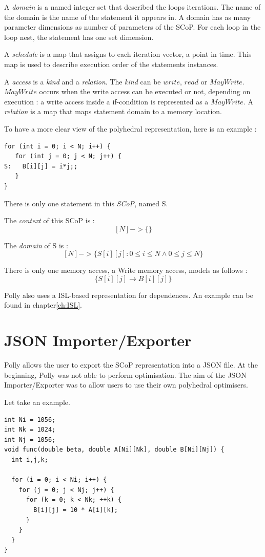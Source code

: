 A \emph{domain} is a named integer set that described the loops iterations. The name of the domain is the name of the statement it appears in. A domain has as many parameter dimensions as number of parameters of the SCoP. For each loop in the loop nest, the statement has one set dimension.

A \emph{schedule} is a map that assigns to each iteration vector, a point in time. This map is used to describe execution order of the statements instances.

A \emph{access} is a \emph{kind} and a \emph{relation}. The \emph{kind} can be $write$, $read$ or $MayWrite$. $MayWrite$ occurs when the write access can be executed or not, depending on execution : a write access inside a if-condition is represented as a $MayWrite$. A \emph{relation} is a map that maps statement domain to a memory location. 

To have a more clear view of the polyhedral representation, here is an example :
\begin{lstlisting}[frame=single]
for (int i = 0; i < N; i++) {
   for (int j = 0; j < N; j++) {
S:   B[i][j] = i*j;;
   }
}
\end{lstlisting}
There is only one statement in this \emph{SCoP}, named S.

The \emph{context} of this SCoP is :
\[
[N] -> \{ \}
\]

The \emph{domain} of S is :
\[
[N] -> \{ S[i][j] : 0\le i \le N \wedge 0\le j \le N \}
\]

There is only one memory access, a Write memory access, models as follows :
\[
\{ S[i][j] \rightarrow B[i][j] \}
\]

Polly also uses a ISL-based representation for dependences. An example can be found in chapter\ref{ch:ISL}.

\section{JSON Importer/Exporter}
Polly allows the user to export the SCoP representation into a JSON file. At the beginning, Polly was not able to perform optimisation. The aim of the JSON Importer/Exporter was to allow users to use their own polyhedral optimisers. 

Let take an example.
\begin{lstlisting}[frame=single]
int Ni = 1056;
int Nk = 1024;
int Nj = 1056;
void func(double beta, double A[Ni][Nk], double B[Ni][Nj]) {
  int i,j,k;

  for (i = 0; i < Ni; i++) {
    for (j = 0; j < Nj; j++) {
      for (k = 0; k < Nk; ++k) {
        B[i][j] = 10 * A[i][k];
      }
    }
  }
}
\end{lstlisting}

